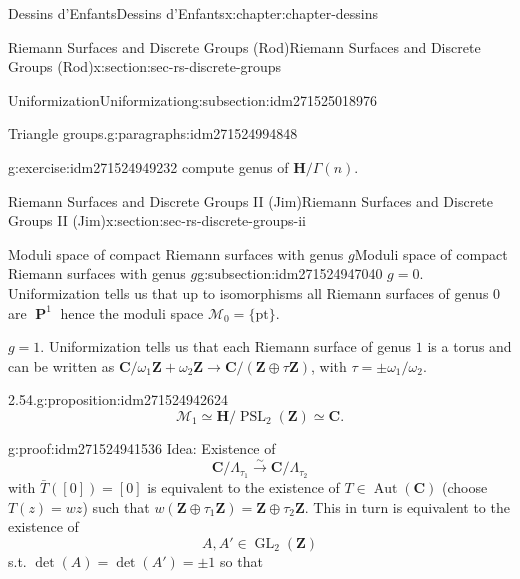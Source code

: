 \documentclass[oneside,10pt,]{book}
\numberwithin{equation}{section}
\newcommand{\lb}{[}
\newcommand{\rb}{]}
\newcommand{\ZZ}{\mathbf{Z}}
\newcommand{\CC}{\mathbf{C}}
\newcommand{\HH}{\mathbf{H}}
\DeclareMathOperator{\PP}{\mathbf{P}}
\DeclareMathOperator{\Aut}{Aut}
\DeclareMathOperator{\GL}{GL}
\DeclareMathOperator{\PSL}{PSL}
\begin{document}
\begin{chapterptx}{Dessins d'Enfants}{}{Dessins d'Enfants}{}{}{x:chapter:chapter-dessins}
\begin{sectionptx}{Riemann Surfaces and Discrete Groups (Rod)}{}{Riemann Surfaces and Discrete Groups (Rod)}{}{}{x:section:sec-rs-discrete-groups}
\begin{subsectionptx}{Uniformization}{}{Uniformization}{}{}{g:subsection:idm271525018976}
\begin{paragraphs}{Triangle groups.}{g:paragraphs:idm271524994848}
\begin{inlineexercise}{}{g:exercise:idm271524949232}
compute genus of \(\HH/\Gamma(n)\).%
\end{inlineexercise}
\end{paragraphs}%
\end{subsectionptx}
\end{sectionptx}
%
%
\typeout{************************************************}
\typeout{************************************************}
%
\begin{sectionptx}{Riemann Surfaces and Discrete Groups II (Jim)}{}{Riemann Surfaces and Discrete Groups II (Jim)}{}{}{x:section:sec-rs-discrete-groups-ii}
%
%
\typeout{************************************************}
\typeout{************************************************}
%
\begin{subsectionptx}{Moduli space of compact Riemann surfaces with genus \(g\)}{}{Moduli space of compact Riemann surfaces with genus \(g\)}{}{}{g:subsection:idm271524947040}
\(g =0\). Uniformization tells us that up to isomorphisms all Riemann surfaces of genus \(0\) are \(\PP^1\) hence the moduli space \(\mathcal M _0  = \{\text{pt}\}\).%
\par
\(g = 1\). Uniformization tells us that each Riemann surface of genus \(1\) is a torus and can be written as \(\CC/ \omega_1\ZZ+ \omega_2\ZZ \to \CC/(\ZZ \oplus \tau \ZZ)\), with \(\tau = \pm \omega_1/\omega_2\).%
\begin{proposition}{2.54.}{}{g:proposition:idm271524942624}%
%
\begin{equation*}
\mathcal M_1 \simeq \HH/ \PSL_2(\ZZ) \simeq \CC\text{.}
\end{equation*}
%
\end{proposition}
\begin{proofptx}{}{g:proof:idm271524941536}
Idea: Existence of%
\begin{equation*}
\CC/ \Lambda_{\tau_1} \xrightarrow{\sim} \CC/\Lambda_{\tau_2}
\end{equation*}
with \(\bar T (\lb 0 \rb) = \lb 0 \rb\) is equivalent to the existence of \(T \in \Aut(\CC)\) (choose \(T(z) = wz\)) such that \(w(\ZZ\oplus \tau_1 \ZZ) = \ZZ\oplus \tau_2\ZZ\). This in turn is equivalent to the existence of%
\begin{equation*}
A,A' \in \GL_2(\ZZ)
\end{equation*}
s.t. \(\det (A) = \det(A') = \pm 1\) so that%
\begin{equation*}

\end{equation*}
\end{proofptx}
\end{subsectionptx}
\end{sectionptx}
\end{chapterptx}
\end{document}

